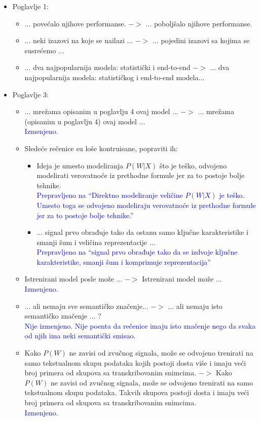 \documentclass[a4paper]{report}
\newcommand{\odgovor}[1]{\textcolor{blue}{#1}}
\begin{document}
\begin{itemize}
  \item Poglavlje 1:
  \begin{itemize}
  \item ... povećalo njihove performanse. $->$ ... poboljšalo njihove performanse.
  \item ... neki izazovi na koje se nailazi ... $->$ ... pojedini izazovi sa kojima se susrećemo ...
  \item ... dva najpopularnija modela: statistički i end-to-end $->$ ... dva najpopularnija modela: statističkog i end-to-end modela...
 \end{itemize}
\end{itemize}

\begin{itemize}
  \item Poglavlje 3:
  \begin{itemize}
  \item ... mrežama opisanim u poglavlju 4 ovaj model ... $->$  ... mrežama (opisanim u poglavlju 4) ovaj model ...\\ \odgovor{Izmenjeno.}
  \item Sledeće rečenice su loše kontruisane, popraviti ih:
  \begin{itemize}
      \item Ideja je umesto modeliranja $P(W|X)$ što je teško, odvojeno modelirati verovatnoće iz prethodne formule jer za to postoje bolje tehnike.\\ \odgovor{Prepravljeno na ``Direktno modeliranje veličine $P(W|X)$ je teško. Umesto toga se odvojeno modeliraju verovatnoće iz prethodne formule jer za to postoje bolje tehnike.''}
      \item ... signal prvo obrađuje tako da ostanu samo ključne karakteristike i smanji šum i veličina reprezentacije ... \\ \odgovor{Prepravljeno na ``signal prvo obrađuje tako da se izdvoje ključne karakteristike, smanji šum i komprimuje reprezentacija''}
  \end{itemize}
  \item Istrenirani model posle može ... $->$ Istrenirani model može ...\\ \odgovor{Izmenjeno.}
  \item ... ali nemaju sve semantičko značenje... $->$ ... ali nemaju isto semantičko značenje ... ? \\ \odgovor{Nije izmenjeno. Nije poenta da rečenice imaju isto značenje nego da svaka od njih ima neki semantički smisao.}
  \item Kako $P(W)$ ne zavisi od zvučnog signala, može se odvojeno trenirati na samo tekstualnom skupu podataka kojih postoji dosta više i imaju veći broj primera od skupova sa transkribovanim snimcima. $->$
Kako $P(W)$ ne zavisi od zvučnog signala, može se odvojeno trenirati na samo tekstualnom skupu podataka. Takvih skupova postoji dosta i imaju veći broj primera od skupova sa transkribovanim snimcima. \\ \odgovor{Izmenjeno.}
 \end{itemize}
\end{itemize}
\end{document}
